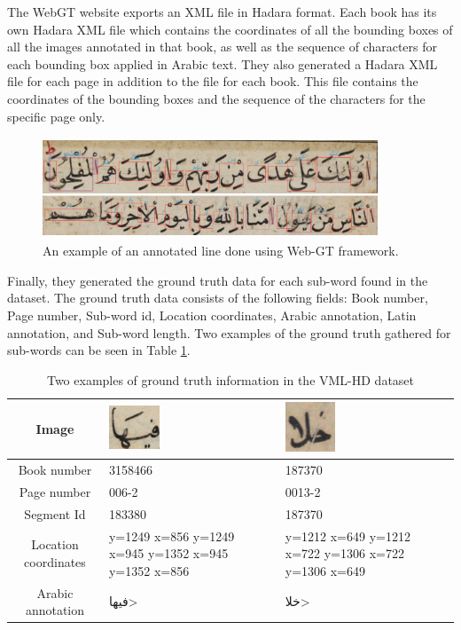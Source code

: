 \noindent
The WebGT website exports an XML file in Hadara\cite{pantke2013hadara} format. Each book has its own Hadara XML file which contains the coordinates of all the bounding boxes of all the images annotated in that book, as well as the sequence of characters for each bounding box applied in Arabic text. They also generated a Hadara XML file for each page in addition to the file for each book. This file contains the coordinates of the bounding boxes and the sequence of the characters for the specific page only. \\

\begin{figure}[!htb]
    \centering
    \includegraphics[width=10cm, height=3cm]{images/Web-GT.png}
    \caption{An example of an annotated line done using Web-GT framework.}
    \label{fig:Web-GT.png}
\end{figure}

Finally, they generated the ground truth data for each sub-word found in the dataset. The ground truth data consists of the following fields: Book number, Page number, Sub-word id, Location coordinates, Arabic annotation, Latin annotation, and Sub-word length. Two examples of the ground truth gathered for sub-words can be seen in Table \ref{table:2.1}.

\begin{table}[!htb]
\begin{center}
\begin{tabular}[htbp!]{ | c | m{3cm}| m{3cm} | } 
  \hline
  Image & \includegraphics[width=1.5cm ]{images/feha.png} & \includegraphics[width=1.5cm ]{images/khla.png} \\ 
  \hline
  Book number & 3158466 & 187370 \\ 
  \hline
  Page number & 006-2 & 0013-2 \\ 
  \hline
  Segment Id & 183380 & 187370 \\ 
  \hline
  Location coordinates & y=1249 x=856  y=1249 x=945  y=1352 x=945
 y=1352   x=856 & y=1212 x=649  y=1212 x=722  y=1306 x=722  y=1306  x=649 \\ 
   \hline
  Arabic annotation & \<فيها>\ &\<خلا> \\ 
  \hline
\end{tabular}
\end{center}
\caption{Two examples of ground truth information in the VML-HD dataset}
\label{table:2.1}
\end{table}

